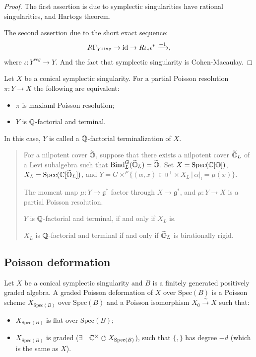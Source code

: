 \documentclass[12pt]{amsart}
\numberwithin{equation}{section}
\newcommand{\fg}{\mathfrak{g}} \newcommand{\fh}{\mathfrak{h}} \newcommand{\fk}{\mathfrak{k}}
\newcommand{\fl}{\mathfrak{l}} \newcommand{\fm}{\mathfrak{m}} \newcommand{\fn}{\mathfrak{n}}
\newcommand{\Spec}{\mathrm{Spec}}
\renewcommand{\tilde}{\widetilde}
\newcommand{\set}[2]{\{#1\,|\,#2\}}
\newcommand{\aiblock}[1]{
  \begin{quote} 
  {\color{CadetBlue}\sffamily\small #1}
  \end{quote}
}
\begin{document}
\begin{proof}
  The first assertion is due to symplectic singularities have rational singularities, and Hartogs theorem.

  The second assertion due to the short exact sequence:
  \[
     R\Gamma_{Y^{sing}} \to {\mathrm{id}} \to R\iota_{*}\iota^* \xrightarrow{+1} ,
  \]
  where $\iota: Y^{reg} \to Y$.
  And the fact that symplectic singularity is Cohen-Macaulay.
\end{proof}

\begin{thm}
  Let $X$ be a conical symplectic singularity. For a partial Poisson resolution $\pi: Y \to X$ the following are equivalent:
  \begin{itemize}
    \item $\pi$ is maxiaml Poisson resolution;
    \item $Y$ is ${\mathbb {Q}}$-factorial and terminal.
  \end{itemize}
\end{thm}

In this case, $Y$ is called a ${\mathbb {Q}}$-factorial terminalization of $X$.

\aiblock{

For a nilpotent cover $\tilde{\BO}$, suppose that there exists a nilpotent cover $\tilde{\BO}_L$ of a Levi subalgebra such that $\mathrm{Bind}_{L}^{G}(\tilde{\BO}_L) = \tilde{\BO}$. Set $X = \Spec(\BC[\BO])$, $X_L = \Spec(\BC[\tilde{\BO}_L])$, and $Y = G \times^{P} \set{(\alpha,x) \in \fn^{\perp} \times X_L }{\alpha|_{\fl} = \mu(x) }$.

\begin{prop}
  The moment map $\mu: Y \to \fg^*$ factor through $X \to \fg^*$, and $\mu: Y \to X$ is a partial Poisson resolution.
\end{prop}

\begin{prop}
  $Y$ is ${\mathbb {Q}}$-factorial and terminal, if and only if $X_L$ is.
\end{prop}

\begin{thm}
  $X_L$ is ${\mathbb {Q}}$-factorial and terminal if and only if $\tilde{\BO}_L$ is birationally rigid.
\end{thm}
}

\subsection{Poisson deformation}

\begin{defn}
  Let $X$ be a conical symplectic singularity and $B$ is a finitely generated positively graded algebra. A graded Poisson deformation of $X$ over $\Spec(B)$ is a Poisson scheme $X_{\Spec(B)}$ over $\Spec(B)$ and a Poisson isomorphism $X_0 \xrightarrow{\sim} X$ such that:
  \begin{itemize}
    \item $X_{\Spec(B)}$ is flat over $\Spec(B)$;
    \item $X_{\Spec(B)}$ is graded ($\exists \quad \BC^{\times} \circlearrowleft X_{\Spec(B)}$), such that $\{ , \}$ has degree $-d$ (which is the same as $X$).
  \end{itemize}
\end{defn}
\end{document}
